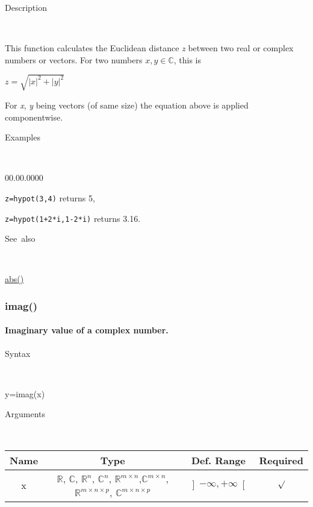 \begin{description}
\item [Description]~
\end{description}
This function calculates the Euclidean distance \textit{z} between two real or complex numbers or vectors.
For two numbers $x,y\in\mathbb{C}$, this is

\medskip{}
$z=\sqrt{|x|^{2}+|y|^{2}}$
\medskip{}

For \textit{x}, \textit{y} being vectors (of same size) the equation above
is applied componentwise.

\begin{description}
\item [Examples]~
\end{description}
\begin{lyxlist}{00.00.0000}
\item [\texttt{z=hypot(3,4)}]returns 5,
\item [\texttt{z=hypot(1+2{*}i,1-2{*}i)}]returns 3.16.
\end{lyxlist}
\begin{description}
\item [See~also]~
\end{description}
\textcolor{blue}{\hyperlink{abs}{abs()}}


\newpage
\subsubsection*{\hypertarget{imag}{}{\Large imag()}}


\paragraph{\label{par:Imag}Imaginary value of a complex number.}

\begin{description}
\item [Syntax]~
\end{description}
y=imag(x)

\begin{description}
\item [Arguments]~
\end{description}
\begin{tabular}{|c|c|c|c|}
\hline 
Name&
Type&
Def. Range&
Required\tabularnewline
\hline
\hline 
x&
$\mathbb{R}$, $\mathbb{C}$, $\mathbb{R}^{n}$, $\mathbb{C}^{n}$,
$\mathbb{\mathbb{R}}^{m\times n}$,$\mathbb{\mathbb{C}}^{m\times n}$,
$\mathbb{\mathbb{R}}^{m\times n\times p}$, $\mathbb{\mathbb{C}}^{m\times n\times p}$ &
$\left]-\infty,+\infty\right[$&
$\surd$\tabularnewline
\hline
\end{tabular}


